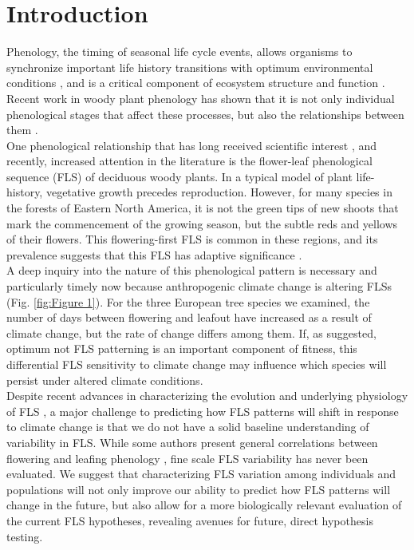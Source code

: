 \documentclass[12pt]{article}\usepackage[]{graphicx}\usepackage[]{color}
\begin{document}
\section*{Introduction}
\indent \indent Phenology, the timing of seasonal life cycle events, allows organisms to synchronize important life history transitions with optimum environmental conditions \citep{Forrest2010}, and is a critical component of ecosystem structure and function \citep{Cleland2007,Piao2007}. Recent work in woody plant phenology has shown that it is not only individual phenological stages that affect these processes, but also the relationships between them \citep{Ettinger2018}.\\
\indent One phenological relationship that has long received scientific interest \citep[see][]{Robertson1895}, and recently, increased attention in the literature \citep{Savage2019, Gougherty2018} is the flower-leaf phenological sequence (FLS) of deciduous woody plants. In a typical model of plant life-history, vegetative growth precedes reproduction. However, for many species in the forests of Eastern North America, it is not the green tips of new shoots that mark the commencement of the growing season, but the subtle reds and yellows of their flowers. This flowering-first FLS is common in these regions, and its prevalence suggests that this FLS has adaptive significance \citep{Rathcke_1985}.\\ 

\indent A deep inquiry into the nature of this phenological pattern is necessary and particularly timely now because anthropogenic climate change is altering FLSs (Fig. \ref{fig:Figure 1}). For the three European tree species we examined, the number of days between flowering and leafout have increased as a result of climate change, but the rate of change differs among them. If, as suggested, optimum not FLS patterning is an important component of fitness, this differential FLS sensitivity to climate change may influence which species will persist under altered climate conditions.\\

\indent Despite recent advances in characterizing the evolution and underlying physiology of FLS \citep{Gougherty2018,Savage2019}, a major challenge to predicting how FLS patterns will shift in response to climate change is that we do not have a solid baseline understanding of variability in FLS. While some authors present general correlations between flowering and leafing phenology \citep{Lechowicz_1995, Ettinger2018}, fine scale FLS variability has never been evaluated. We suggest that characterizing FLS variation among individuals and populations will not only improve our ability to predict how FLS patterns will change in the future, but also allow for a more biologically relevant evaluation of the current FLS hypotheses, revealing avenues for future, direct hypothesis testing.\\
\end{document}
